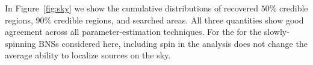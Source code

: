 In Figure~\ref{fig:sky} we show the cumulative distributions of recovered $50\%$ credible regions, $90\%$ credible regions, and searched areas. All three quantities show good agreement across all parameter-estimation techniques. %
For the for the slowly-spinning BNSs considered here, including spin in the analysis does not change the average ability to localize sources on the sky.

  
  
  
  
  
  
  
  
  
  
  
  
  